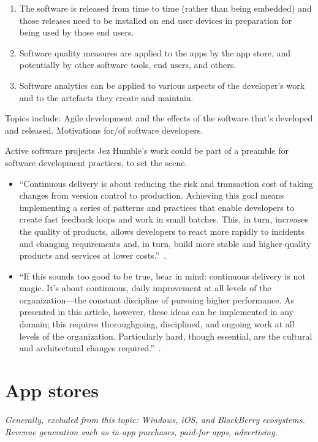 \begin{enumerate}
    \item The software is released from time to time (rather than being embedded) and those releases need to be installed on end user devices in preparation for being used by those end users.
    \item Software quality measures are applied to the apps by the app store, and potentially by other software tools, end users, and others. 
    \item Software analytics can be applied to various aspects of the developer's work and to the artefacts they create and maintain.
\end{enumerate}

Topics include: Agile development and the effects of the software that's developed and released. Motivations for/of software developers.

Active software projects 
Jez Humble's work could be part of a preamble for software development practices, to set the scene.

\begin{itemize}
    \item ``Continuous delivery is about reducing the risk and transaction cost of taking changes from version control to production. Achieving this goal means implementing a series of patterns and practices that enable developers to create fast feedback loops and work in small batches. This, in turn, increases the quality of products, allows developers to react more rapidly to incidents and changing requirements and, in turn, build more stable and higher-quality products and services at lower costs.''~\cite{humble2018_continuous_delivery_sounds_great}. 
    \item ``If this sounds too good to be true, bear in mind: continuous delivery is not magic. It's about continuous, daily improvement at all levels of the organization—the constant discipline of pursuing higher performance. As presented in this article, however, these ideas can be implemented in any domain; this requires thoroughgoing, disciplined, and ongoing work at all levels of the organization. Particularly hard, though essential, are the cultural and architectural changes required.''~\cite{humble2018_continuous_delivery_sounds_great}. 
\end{itemize}


\section{App stores}
\textit{Generally, excluded from this topic: Windows, iOS, and BlackBerry ecosystems. Revenue generation such as in-app purchases, paid-for apps, advertising.} 

